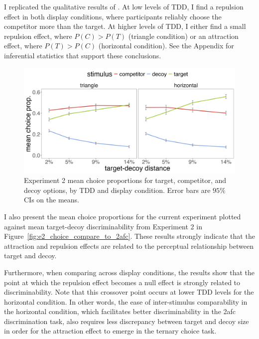 I replicated the qualitative results of \textcite{spektorWhenGoodLooks2018b}. At low levels of TDD, I find a repulsion effect in both display conditions, where participants reliably choose the competitor more than the target. At higher levels of TDD, I either find a small repulsion effect, where $P(C)>P(T)$ (triangle condition) or an attraction effect, where $P(T)>P(C)$ (horizontal condition). See the Appendix for inferential statistics that support these conclusions.

\begin{figure}
   \includegraphics[width=\textwidth]{figures/choicePhase_att_trials_mean_choice_props_collapsed.jpg}
   \caption{Experiment 2 mean choice proportions for target, competitor, and decoy options, by TDD and display condition. Error bars are $95\%$ CIs on the means.}
   \label{fig:e2_choiceprops}
\end{figure}

I also present the mean choice proportions for the current experiment plotted against mean target-decoy discriminability from Experiment 2 in Figure~\ref{fig:e2_choice_compare_to_2afc}. These results strongly indicate that the attraction and repulsion effects are related to the perceptual relationship between target and decoy. 

Furthermore, when comparing across display conditions, the results show that the point at which the repulsion effect becomes a null effect is strongly related to discriminability. Note that this crossover point occurs at lower TDD levels for the horizontal condition. In other words, the ease of inter-stimulus comparability in the horizontal condition, which facilitates better discriminability in the 2afc discrimination task, also requires less discrepancy between target and decoy size in order for the attraction effect to emerge in the ternary choice task.

